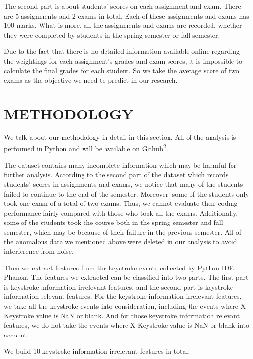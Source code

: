 \documentclass[sigconf,final]{acmart}
\begin{document}
The second part is about students’ scores on each assignment and exam. There are 5 assignments and 2 exams in total. Each of these assignments and exams has 100 marks. What is more, all the assignments and exams are recorded, whether they were completed by students in the spring semester or fall semester.

Due to the fact that there is no detailed information available online regarding the weightings for each assignment's grades and exam scores, it is impossible to calculate the final grades for each student. So we take the average score of two exams as the objective we need to predict in our research.



\section{METHODOLOGY}

We talk about our methodology in detail in this section. All of the analysis is performed in Python and will be available on Github\textsuperscript{2}. 


The dataset contains many incomplete information which may be harmful for further analysis. According to the second part of the dataset which records students’ scores in assignments and exams, we notice that many of the students failed to continue to the end of the semester. Moreover, some of the students only took one exam of a total of two exams. Thus, we cannot evaluate their coding performance fairly compared with those who took all the exams. Additionally, some of the students took the course both in the spring semester and fall semester, which may be because of their failure in the previous semester. All of the anomalous data we mentioned
above were deleted in our analysis to avoid interference from noise.

Then we extract features from the keystroke events collected by Python IDE Phanon. The features we extracted can be classified into two parts. The first part is keystroke information irrelevant features, and the second part is keystroke information relevant features. For the keystroke information irrelevant features, we take all the keystroke events into consideration, including the events where X-Keystroke value is NaN or blank. And for those keystroke information relevant features, we do not take the events where X-Keystroke value is NaN or blank into account.


We build 10 keystroke information irrelevant features in total:
\end{document}

